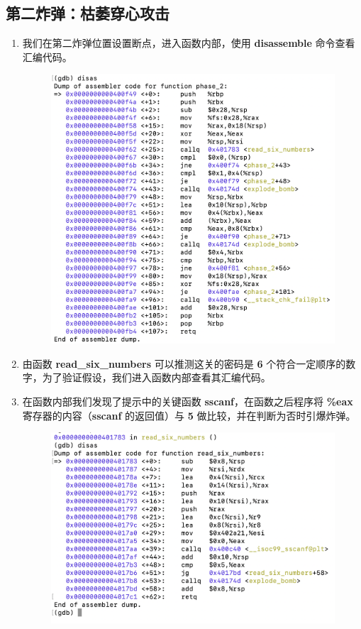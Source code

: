     \subsection{第二炸弹：枯萎穿心攻击}
        \begin{enumerate}
            \item 我们在第二炸弹位置设置断点，进入函数内部，使用 \textbf{disassemble} 命令查看汇编代码。
                \begin{figure}[htbp]
                    \centering
                    \includegraphics*[width = 12cm]{s2_0.png}
                \end{figure}
            \item 由函数 \textbf{read\_six\_numbers} 可以推测这关的密码是 \textbf{6} 个符合一定顺序的数字，为了验证假设，我们进入函数内部查看其汇编代码。
            \item 在函数内部我们发现了提示中的关键函数 \textbf{sscanf}，在函数之后程序将 \textbf{\%eax} 寄存器的内容（\textbf{sscanf} 的返回值）与 \textbf{5} 做比较，并在判断为否时引爆炸弹。
                \begin{figure}[htbp]
                    \centering
                    \includegraphics*[width = 12cm]{s2_1.png}

\end{figure}
\end{enumerate}
